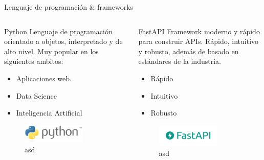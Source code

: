 \documentclass[aspectratio=169,xcolor=dvipsnames]{beamer}
\begin{document}
	\begin{frame}{Lenguaje de programación \& frameworks}
		\begin{columns}
			\begin{column}{0.5\textwidth}
				\begin{exampleblock}{Python}
					Lenguaje de programación orientado a objetos, interpretado y de alto nivel. Muy popular en los siguientes ambitos:
					
					\begin{itemize}
						\item Aplicaciones web.
						
						\item Data Science
						
						\item Inteligencia Artificial
					\end{itemize}
					
					\begin{figure}[h!]
						\begin{center}
							\includegraphics[width=0.7\textwidth]{img/python_logo.png}
							\caption{asd}
						\end{center}
					\end{figure}
				\end{exampleblock}
			\end{column}
		
			\begin{column}{0.5\textwidth}
				\begin{exampleblock}{FastAPI}
					Framework moderno y rápido para construir APIs. Rápido, intuitivo y robusto, además de basado en estándares de la industria.
					
					\begin{itemize}
						\item Rápido
						\item Intuitivo
						\item Robusto
					\end{itemize}
					
					
					\begin{figure}[h!]
						\begin{center}
							\includegraphics[width=0.7\textwidth]{img/fastapi_logo.png}
							\caption{asd}
						\end{center}
					\end{figure}
				\end{exampleblock}
				

\end{column}
\end{columns}
\end{frame}
\end{document}
